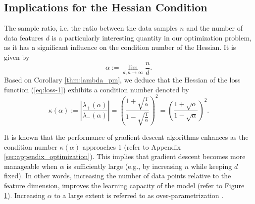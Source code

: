 \documentclass{article}
\begin{document}
\subsection{Implications for the Hessian Condition}
The sample ratio, i.e. the ratio between the data samples $n$ and the number of data features $d$ is a particularly interesting quantity in our optimization problem, as it has a significant influence on the condition number of the Hessian. It is given by
\begin{equation}
\alpha:=\lim_{d,n\to\infty}\frac{n}{d}.
\end{equation}
Based on Corollary \ref{thm:lambda_pm}, we deduce that the Hessian of the loss function (\ref{eq:loss-1}) exhibits a condition number denoted by
\begin{equation}
\kappa(\alpha):=\left |\frac{\lambda_+(\alpha)}{\lambda_-(\alpha)}\right |=\left(\frac{1+\sqrt{\frac{1}{\alpha}}}{1-\sqrt{\frac{1}{\alpha}}}\right)^2=\left(\frac{1+\sqrt{\alpha}}{1-\sqrt{\alpha}}\right)^2\label{eq:kappa-MP}.
\end{equation}
\par
It is known that the performance of gradient descent algorithms enhances as the condition number $\kappa(\alpha)$ approaches 1 (refer to Appendix \ref{sec:appendix_optimization}). This implies that gradient descent becomes more manageable when $\alpha$ is sufficiently large (e.g., by increasing $n$ while keeping $d$ fixed). In other words, increasing the number of data points relative to the feature dimension, improves the learning capacity of the model (refer to Figure \ref{fig:condition}). Increasing $\alpha$ to a large extent is referred to as over-parametrization \cite{soltanolkotabi, mannelli}.
\par
\begin{figure}[!htb]
\centering
{}
\label{fig:condition}
\end{figure}
\end{document}
